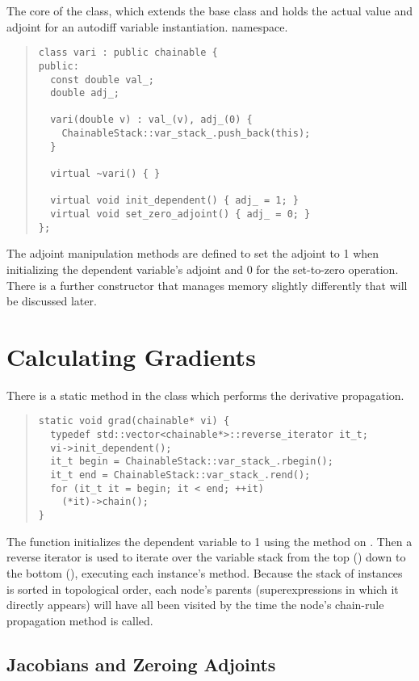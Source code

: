 \documentclass[10pt]{article}
\begin{document}
The core of the  class, which extends the base class
 and holds the actual value and adjoint for an
autodiff variable instantiation.  namespace.  
%
\begin{quote}
\begin{Verbatim}
class vari : public chainable {
public:
  const double val_;
  double adj_;

  vari(double v) : val_(v), adj_(0) { 
    ChainableStack::var_stack_.push_back(this);
  }

  virtual ~vari() { }

  virtual void init_dependent() { adj_ = 1; }
  virtual void set_zero_adjoint() { adj_ = 0; }
};
\end{Verbatim}
\end{quote}
%
The adjoint manipulation
methods are defined to set the adjoint to 1 when initializing the
dependent variable's adjoint and 0 for the set-to-zero
operation. There is a further constructor that manages memory slightly
differently that will be discussed
later.

\section{Calculating Gradients}

There is a static method in the  class which
performs the derivative propagation.
%
\begin{quote}
\begin{Verbatim}
static void grad(chainable* vi) {
  typedef std::vector<chainable*>::reverse_iterator it_t;
  vi->init_dependent(); 
  it_t begin = ChainableStack::var_stack_.rbegin();
  it_t end = ChainableStack::var_stack_.rend();
  for (it_t it = begin; it < end; ++it)
    (*it)->chain();
}
\end{Verbatim}
\end{quote}
%
The function initializes the dependent variable to 1 using the
 method on .  Then a reverse
iterator is used to iterate over the variable stack from the top
() down to the bottom (), executing each
 instance's  method.  Because the stack
of  instances is sorted in topological order, each
node's parents (superexpressions in which it directly appears) will
have all been visited by the time the node's chain-rule propagation
method is called.

\subsection{Jacobians and Zeroing Adjoints}
\end{document}
